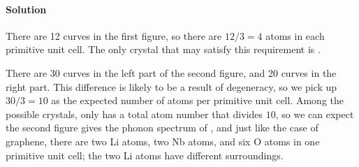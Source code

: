 \documentclass[hyperref, a4paper]{article}
\begin{document}
\paragraph{Solution} There are 12 curves in the first figure, 
so there are $12 / 3 = 4$ atoms in each primitive unit cell.
The only crystal that may satisfy this requirement is .

There are 30 curves in the left part of the second figure,
and 20 curves in the right part.
This difference is likely to be a result of degeneracy,
so we pick up $30 / 3 = 10$ as the expected number of atoms per primitive unit cell.
Among the possible crystals,
only  has a total atom number that divides $10$,
so we can expect the second figure gives the phonon spectrum of ,
and just like the case of graphene,
there are two Li atoms, two Nb atoms, and six O atoms in one primitive unit cell;
the two Li atoms have different surroundings.



\end{document}
